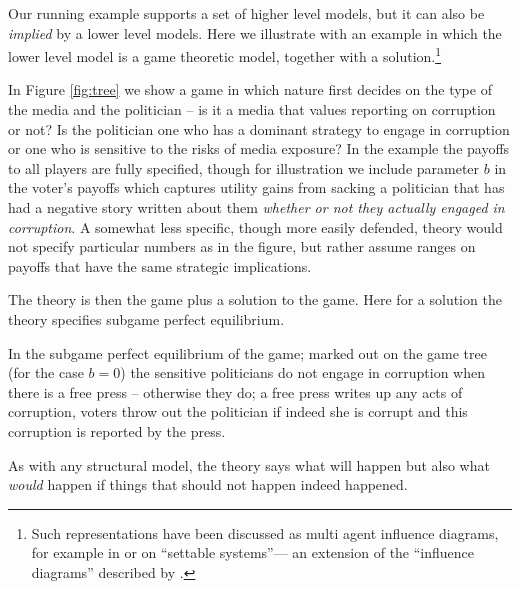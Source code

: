 \documentclass[12pt,]{book}
\let\rmarkdownfootnote\footnote%
\def\footnote{\protect\rmarkdownfootnote}
\begin{document}
Our running example supports a set of higher level models, but it can also be \emph{implied} by a lower level models. Here we illustrate with an example in which the lower level model is a game theoretic model, together with a solution.\footnote{Such representations have been discussed as multi agent influence diagrams, for example in \citet{koller2003multi} or \citet{white2009settable} on ``settable systems''--- an extension of the ``influence diagrams'' described by \citet{dawid2002influence}.}

In Figure \ref{fig:tree} we show a game in which nature first decides on the type of the media and the politician -- is it a media that values reporting on corruption or not? Is the politician one who has a dominant strategy to engage in corruption or one who is sensitive to the risks of media exposure? In the example the payoffs to all players are fully specified, though for illustration we include parameter \(b\) in the voter's payoffs which captures utility gains from sacking a politician that has had a negative story written about them \emph{whether or not they actually engaged in corruption}. A somewhat less specific, though more easily defended, theory would not specify particular numbers as in the figure, but rather assume ranges on payoffs that have the same strategic implications.

The theory is then the game plus a solution to the game. Here for a solution the theory specifies subgame perfect equilibrium.

In the subgame perfect equilibrium of the game; marked out on the game tree (for the case \(b=0\)) the sensitive politicians do not engage in corruption when there is a free press -- otherwise they do; a free press writes up any acts of corruption, voters throw out the politician if indeed she is corrupt and this corruption is reported by the press.

As with any structural model, the theory says what will happen but also what \emph{would} happen if things that should not happen indeed happened.
\end{document}
